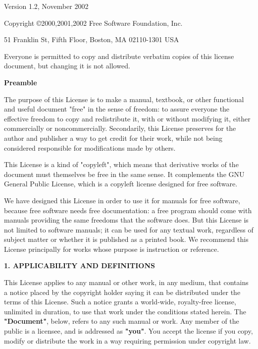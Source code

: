 \documentclass[a4paper,12pt]{book}
\begin{document}
 \begin{center}

       Version 1.2, November 2002


 Copyright \copyright 2000,2001,2002  Free Software Foundation, Inc.
 
 \bigskip
 
     51 Franklin St, Fifth Floor, Boston, MA  02110-1301  USA
  
 \bigskip
 
 Everyone is permitted to copy and distribute verbatim copies
 of this license document, but changing it is not allowed.
\end{center}


\begin{center}
{\bf\large Preamble}
\end{center}

The purpose of this License is to make a manual, textbook, or other
functional and useful document "free" in the sense of freedom: to
assure everyone the effective freedom to copy and redistribute it,
with or without modifying it, either commercially or noncommercially.
Secondarily, this License preserves for the author and publisher a way
to get credit for their work, while not being considered responsible
for modifications made by others.

This License is a kind of "copyleft", which means that derivative
works of the document must themselves be free in the same sense.  It
complements the GNU General Public License, which is a copyleft
license designed for free software.

We have designed this License in order to use it for manuals for free
software, because free software needs free documentation: a free
program should come with manuals providing the same freedoms that the
software does.  But this License is not limited to software manuals;
it can be used for any textual work, regardless of subject matter or
whether it is published as a printed book.  We recommend this License
principally for works whose purpose is instruction or reference.


\begin{center}
{\Large\bf 1. APPLICABILITY AND DEFINITIONS}
\end{center}

This License applies to any manual or other work, in any medium, that
contains a notice placed by the copyright holder saying it can be
distributed under the terms of this License.  Such a notice grants a
world-wide, royalty-free license, unlimited in duration, to use that
work under the conditions stated herein.  The \textbf{"Document"}, below,
refers to any such manual or work.  Any member of the public is a
licensee, and is addressed as \textbf{"you"}.  You accept the license if you
copy, modify or distribute the work in a way requiring permission
under copyright law.
\end{document}
